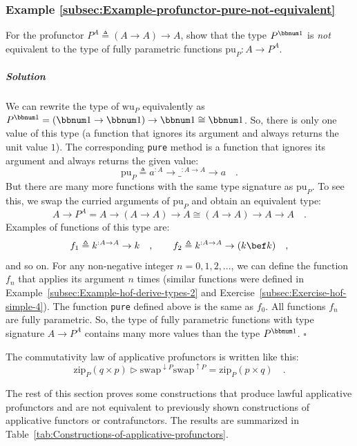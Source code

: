 \subsubsection{Example \label{subsec:Example-profunctor-pure-not-equivalent}\ref{subsec:Example-profunctor-pure-not-equivalent}}

For the profunctor $P^{A}\triangleq\left(A\rightarrow A\right)\rightarrow A$,
show that the type $P^{\bbnum 1}$ is \emph{not} equivalent to the
type of fully parametric functions $\text{pu}_{P}:A\rightarrow P^{A}$.

\subparagraph{Solution}

We can rewrite the type of $\text{wu}_{P}$ equivalently as $P^{\bbnum 1}=\left(\bbnum 1\rightarrow\bbnum 1\right)\rightarrow\bbnum 1\cong\bbnum 1$.
So, there is only one value of this type (a function that ignores
its argument and always returns the unit value $1$). The corresponding
\lstinline!pure! method is a function that ignores its argument and
always returns the given value:
\[
\text{pu}_{P}\triangleq a^{:A}\rightarrow\_^{:A\rightarrow A}\rightarrow a\quad.
\]
But there are many more functions with the same type signature as
$\text{pu}_{P}$. To see this, we swap the curried arguments of $\text{pu}_{P}$
and obtain an equivalent type: 
\[
A\rightarrow P^{A}=A\rightarrow\left(A\rightarrow A\right)\rightarrow A\cong\left(A\rightarrow A\right)\rightarrow A\rightarrow A\quad.
\]
Examples of functions of this type are:
\[
f_{1}\triangleq k^{:A\rightarrow A}\rightarrow k\quad,\quad\quad f_{2}\triangleq k^{:A\rightarrow A}\rightarrow(k\bef k)\quad,
\]
and so on. For any non-negative integer $n=0,1,2,...$, we can define
the function $f_{n}$ that applies its argument $n$ times (similar
functions were defined in Example~\ref{subsec:Example-hof-derive-types-2}
and Exercise~\ref{subsec:Exercise-hof-simple-4}). The function \lstinline!pure!
defined above is the same as $f_{0}$. All functions $f_{n}$ are
fully parametric. So, the type of fully parametric functions with
type signature $A\rightarrow P^{A}$ contains many more values than
the type $P^{\bbnum 1}$. $\square$

The commutativity law of applicative profunctors is written like this:
\[
\text{zip}_{P}(q\times p)\triangleright\text{swap}^{\downarrow P}\text{swap}^{\uparrow P}=\text{zip}_{P}(p\times q)\quad.
\]

The rest of this section proves some constructions that produce lawful
applicative profunctors and are not equivalent to previously shown
constructions of applicative functors or contrafunctors. The results
are summarized in Table~\ref{tab:Constructions-of-applicative-profunctors}.

